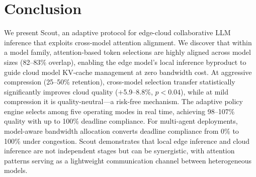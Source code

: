 \documentclass[conference]{IEEEtran}
\begin{document}
\section{Conclusion}
\label{sec:conclusion}

We present Scout, an adaptive protocol for edge-cloud collaborative LLM inference that exploits cross-model attention alignment.
We discover that within a model family, attention-based token selections are highly aligned across model sizes (82--83\% overlap), enabling the edge model's local inference byproduct to guide cloud model KV-cache management at zero bandwidth cost.
At aggressive compression (25--50\% retention), cross-model selection transfer statistically significantly improves cloud quality ($+$5.9--8.8\%, $p < 0.04$), while at mild compression it is quality-neutral---a risk-free mechanism.
The adaptive policy engine selects among five operating modes in real time, achieving 98--107\% quality with up to 100\% deadline compliance.
For multi-agent deployments, model-aware bandwidth allocation converts deadline compliance from 0\% to 100\% under congestion.
Scout demonstrates that local edge inference and cloud inference are not independent stages but can be synergistic, with attention patterns serving as a lightweight communication channel between heterogeneous models.

\balance
\end{document}

